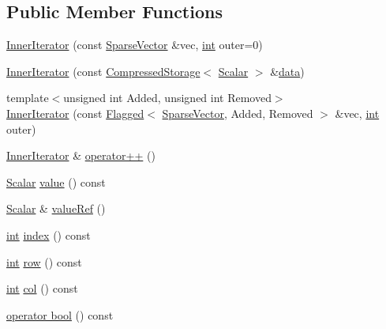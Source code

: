 \subsection*{Public Member Functions}
\begin{DoxyCompactItemize}
\item 
\hyperlink{class_sparse_vector_1_1_inner_iterator_ae878fa03f2cadb7f8bca96d878938c18}{Inner\-Iterator} (const \hyperlink{class_sparse_vector}{Sparse\-Vector} \&vec, \hyperlink{ioapi_8h_a787fa3cf048117ba7123753c1e74fcd6}{int} outer=0)
\item 
\hyperlink{class_sparse_vector_1_1_inner_iterator_a5855ee114da94a088997080f9fdcdf46}{Inner\-Iterator} (const \hyperlink{class_compressed_storage}{Compressed\-Storage}$<$ \hyperlink{class_sparse_matrix_base_af39d70f2b7e775e9e17b666cd24128c8}{Scalar} $>$ \&\hyperlink{glext_8h_a8850df0785e6fbcc2351af3b686b8c7a}{data})
\item 
{\footnotesize template$<$unsigned int Added, unsigned int Removed$>$ }\\\hyperlink{class_sparse_vector_1_1_inner_iterator_a6df042725c97fdf2285a5b4d304ce7ed}{Inner\-Iterator} (const \hyperlink{class_flagged}{Flagged}$<$ \hyperlink{class_sparse_vector}{Sparse\-Vector}, Added, Removed $>$ \&vec, \hyperlink{ioapi_8h_a787fa3cf048117ba7123753c1e74fcd6}{int} outer)
\item 
\hyperlink{class_sparse_vector_1_1_inner_iterator}{Inner\-Iterator} \& \hyperlink{class_sparse_vector_1_1_inner_iterator_a6dfcad21df8a4617042d69ece3d20636}{operator++} ()
\item 
\hyperlink{class_sparse_matrix_base_af39d70f2b7e775e9e17b666cd24128c8}{Scalar} \hyperlink{class_sparse_vector_1_1_inner_iterator_a090846143cd7503f665e1a2432af272a}{value} () const 
\item 
\hyperlink{class_sparse_matrix_base_af39d70f2b7e775e9e17b666cd24128c8}{Scalar} \& \hyperlink{class_sparse_vector_1_1_inner_iterator_a520a87d4c308c1a5f7d33924a9e04a76}{value\-Ref} ()
\item 
\hyperlink{ioapi_8h_a787fa3cf048117ba7123753c1e74fcd6}{int} \hyperlink{class_sparse_vector_1_1_inner_iterator_aa290d9b1f0d4d44245765a532b5f1837}{index} () const 
\item 
\hyperlink{ioapi_8h_a787fa3cf048117ba7123753c1e74fcd6}{int} \hyperlink{class_sparse_vector_1_1_inner_iterator_a78f77321009b597be248a1a96a3d6bd6}{row} () const 
\item 
\hyperlink{ioapi_8h_a787fa3cf048117ba7123753c1e74fcd6}{int} \hyperlink{class_sparse_vector_1_1_inner_iterator_a21efbcb0e2209d17282b2a8f33361c6d}{col} () const 
\item 
\hyperlink{class_sparse_vector_1_1_inner_iterator_afa6ca36f6b8ba046851a87cc6a2301fb}{operator bool} () const 
\end{DoxyCompactItemize}
